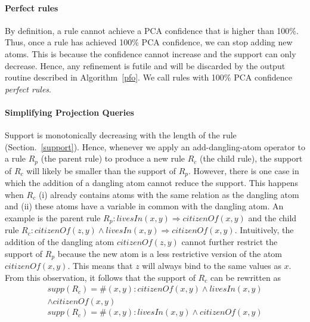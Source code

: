 \paragraph{Perfect rules}
By definition, a rule cannot achieve a PCA confidence that is higher than 100\%. 
Thus, once a rule has achieved 100\% PCA confidence, we can stop adding new atoms. 
This is because the confidence cannot increase and the support can only decrease. 
Hence, any refinement is futile and will be discarded by the output routine described in 
Algorithm~\ref{pfo}. 
We call rules with 100\% PCA confidence \emph{perfect rules}.



\paragraph{Simplifying Projection Queries}
Support is monotonically decreasing with the length of the rule (Section.~\ref{support}). Hence, whenever we apply an add-dangling-atom operator to a rule $R_p$ (the parent rule) to produce
a new rule $R_c$ (the child rule), the support of $R_c$ will likely be smaller than the support of $R_p$.
However, there is one case in which the addition of a dangling atom cannot reduce the support. 
This happens when $R_c$ 
(i) already contains atoms with the same relation as the dangling atom and 
(ii) these atoms have a variable in common with the dangling atom.
An example is the parent rule $R_p:livesIn(x,y)\Rightarrow citizenOf(x,y)$ and the child rule 
$R_c: citizenOf(z,y)\wedge livesIn(x,y)\Rightarrow citizenOf(x,y)$.
Intuitively, the addition of the dangling atom $\textit{citizenOf}(z,y)$ cannot further restrict the support of $R_p$ because
the new atom is a less restrictive version of the atom $citizenOf(x,y)$.
This means that $z$ will always bind to the same values as $x$. 
From this observation, it follows that the support of $R_c$ can be rewritten as 
\begin{multline*}
supp(R_c) = \#(x,y):  citizenOf(x,y)\wedge livesIn(x,y) \\ \wedge citizenOf(x,y)
\end{multline*}
\[
 supp(R_c) = \#(x,y):   livesIn(x,y)\wedge citizenOf(x,y)
\]


